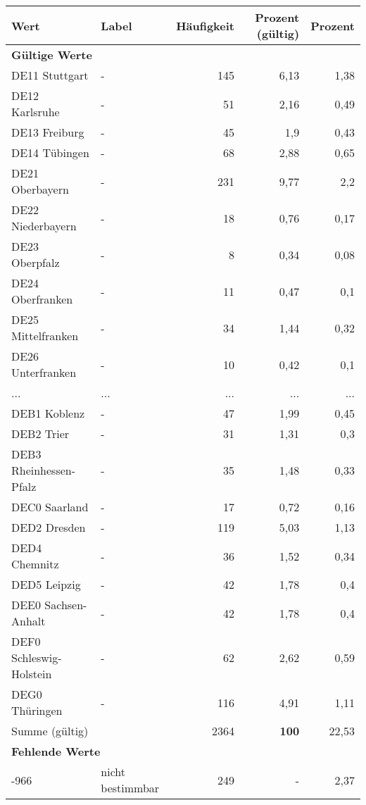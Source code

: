      \begin{longtable}{Xlrrr}
     \toprule
     \textbf{Wert} & \textbf{Label} & \textbf{Häufigkeit} & \textbf{Prozent (gültig)} & \textbf{Prozent} \\
     \endhead
     \midrule
     \multicolumn{5}{l}{\textbf{Gültige Werte}}\\
        \multicolumn{1}{X}{DE11 Stuttgart} & - & 145 & 6,13 & 1,38 \\
        \multicolumn{1}{X}{DE12 Karlsruhe} & - & 51 & 2,16 & 0,49 \\
        \multicolumn{1}{X}{DE13 Freiburg} & - & 45 & 1,9 & 0,43 \\
        \multicolumn{1}{X}{DE14 Tübingen} & - & 68 & 2,88 & 0,65 \\
        \multicolumn{1}{X}{DE21 Oberbayern} & - & 231 & 9,77 & 2,2 \\
        \multicolumn{1}{X}{DE22 Niederbayern} & - & 18 & 0,76 & 0,17 \\
        \multicolumn{1}{X}{DE23 Oberpfalz} & - & 8 & 0,34 & 0,08 \\
        \multicolumn{1}{X}{DE24 Oberfranken} & - & 11 & 0,47 & 0,1 \\
        \multicolumn{1}{X}{DE25 Mittelfranken} & - & 34 & 1,44 & 0,32 \\
        \multicolumn{1}{X}{DE26 Unterfranken} & - & 10 & 0,42 & 0,1 \\
       ... & ... & ... & ... & ... \\
        \multicolumn{1}{X}{DEB1 Koblenz} & - & 47 & 1,99 & 0,45 \\
        \multicolumn{1}{X}{DEB2 Trier} & - & 31 & 1,31 & 0,3 \\
        \multicolumn{1}{X}{DEB3 Rheinhessen-Pfalz} & - & 35 & 1,48 & 0,33 \\
        \multicolumn{1}{X}{DEC0 Saarland} & - & 17 & 0,72 & 0,16 \\
        \multicolumn{1}{X}{DED2 Dresden} & - & 119 & 5,03 & 1,13 \\
        \multicolumn{1}{X}{DED4 Chemnitz} & - & 36 & 1,52 & 0,34 \\
        \multicolumn{1}{X}{DED5 Leipzig} & - & 42 & 1,78 & 0,4 \\
        \multicolumn{1}{X}{DEE0 Sachsen-Anhalt} & - & 42 & 1,78 & 0,4 \\
        \multicolumn{1}{X}{DEF0 Schleswig-Holstein} & - & 62 & 2,62 & 0,59 \\
        \multicolumn{1}{X}{DEG0 Thüringen} & - & 116 & 4,91 & 1,11 \\
     \midrule
      \multicolumn{2}{l}{Summe (gültig)} & 2364 &
      \textbf{100} &
         22,53 \\
     \multicolumn{5}{l}{\textbf{Fehlende Werte}}\\
       -966 & nicht bestimmbar & 249 & - & 2,37 \\


\end{longtable}
